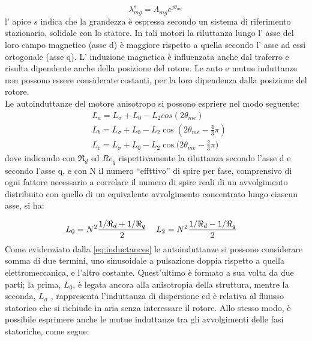 \begin{equation}
    \lambda_{mg}^s=\Lambda_{mg}e^{j\theta_{me}}
\end{equation}
 l’ apice $s$ indica che la grandezza è espressa secondo un sistema di riferimento stazionario,
 solidale con lo statore.  In tali motori la riluttanza lungo
l’ asse del loro campo magnetico (asse d) è maggiore rispetto a quella
secondo l’ asse ad essi ortogonale (asse q). L’ induzione magnetica è influenzata anche dal traferro e risulta dipendente anche della posizione del rotore. Le auto e mutue
induttanze non possono
essere considerate costanti, per la loro dipendenza dalla posizione del rotore.\\
Le autoinduttanze del motore anisotropo si possono espriere nel modo seguente:
\begin{equation}
    \begin{aligned}
    &L_a=L_\sigma+L_0-L_2cos(2\theta_{me})\\
    &L_b=L_\sigma+L_0-L_2\cos{(2\theta_{me}-\frac{4}{3}\pi)}\\
    &L_c=L_\sigma+L_0-L_2\cos{(2\theta_{me}-\frac{2}{3}\pi})
    \end{aligned}
    \label{eq:inductances}
\end{equation}
dove indicando con $\Re_d$ ed $Re_q$ rispettivamente la riluttanza secondo l’asse d e
secondo l’asse q, e con N il numero “effttivo” di spire per fase, comprensivo di
ogni fattore necessario a correlare il numero di spire reali di un avvolgimento
distribuito con quello di un equivalente avvolgimento concentrato lungo ciascun
asse, si ha:

\begin{equation}
    L_0=N^2\frac{1/\Re_d+1/\Re_q}{2} \hspace{4mm} L_2=N^2\frac{1/\Re_d-1/\Re_q}{2} \hspace{4mm}
    \label{eq:double_L2}
\end{equation}
Come evidenziato dalla \ref{eq:inductances} le autoinduttanze si possono considerare somma
di due termini, uno sinusoidale a pulsazione doppia rispetto a quella elettromeccanica,
e l’altro costante. Quest’ultimo è formato a sua volta da due parti;
la prima, $L_0$, è legata ancora alla anisotropia della struttura, mentre la seconda,
$L_\sigma$ , rappresenta l’induttanza di dispersione ed è relativa al fluusso statorico che si
richiude in aria senza interessare il rotore.
Allo stesso modo, è possibile esprimere anche le mutue induttanze tra gli
avvolgimenti delle fasi statoriche, come segue:

